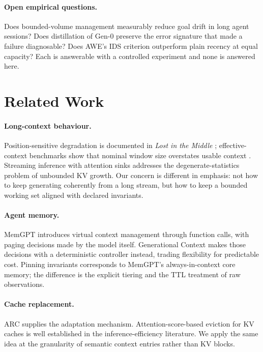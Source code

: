 ﻿\documentclass[11pt,a4paper]{article}
\theoremstyle{plain}
\theoremstyle{definition}
\theoremstyle{remark}
\begin{document}
\paragraph{Open empirical questions.}
Does bounded-volume management measurably reduce goal drift in long agent
sessions? Does distillation of Gen-0 preserve the error signature that made a
failure diagnosable? Does AWE's IDS criterion outperform plain recency at equal
capacity? Each is answerable with a controlled experiment and none is answered
here.

\section{Related Work}
\label{sec:related}

\paragraph{Long-context behaviour.} Position-sensitive degradation is documented
in \emph{Lost in the Middle} \cite{liu2023lost}; effective-context benchmarks
show that nominal window size overstates usable context \cite{hsieh2024ruler}.
Streaming inference with attention sinks \cite{xiao2023streamingllm} addresses
the degenerate-statistics problem of unbounded KV growth. Our concern is
different in emphasis: not how to keep generating coherently from a long stream,
but how to keep a bounded working set aligned with declared invariants.

\paragraph{Agent memory.} MemGPT \cite{packer2023memgpt} introduces virtual
context management through function calls, with paging decisions made by the
model itself. Generational Context makes those decisions with a deterministic
controller instead, trading flexibility for predictable cost. Pinning invariants
corresponds to MemGPT's always-in-context core memory; the difference is the
explicit tiering and the TTL treatment of raw observations.

\paragraph{Cache replacement.} ARC \cite{megiddo2003arc} supplies the adaptation
mechanism. Attention-score-based eviction for KV caches is well established in
the inference-efficiency literature. We apply the same idea at the granularity of
semantic context entries rather than KV blocks.
\end{document}
